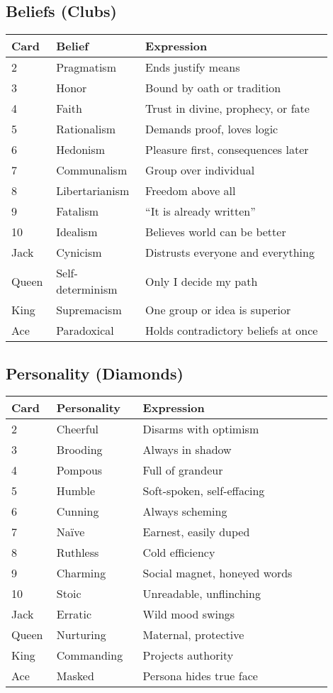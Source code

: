 \documentclass[12pt]{article}
\begin{document}
\subsection*{Beliefs (Clubs)}
\begin{longtable}{|p{0.1\linewidth}|p{0.25\linewidth}|p{0.55\linewidth}|}
\hline
\textbf{Card} & \textbf{Belief} & \textbf{Expression} \\
\hline
2 & Pragmatism & Ends justify means \\
3 & Honor & Bound by oath or tradition \\
4 & Faith & Trust in divine, prophecy, or fate \\
5 & Rationalism & Demands proof, loves logic \\
6 & Hedonism & Pleasure first, consequences later \\
7 & Communalism & Group over individual \\
8 & Libertarianism & Freedom above all \\
9 & Fatalism & ``It is already written'' \\
10 & Idealism & Believes world can be better \\
Jack & Cynicism & Distrusts everyone and everything \\
Queen & Self-determinism & Only I decide my path \\
King & Supremacism & One group or idea is superior \\
Ace & Paradoxical & Holds contradictory beliefs at once \\
\hline
\end{longtable}

\subsection*{Personality (Diamonds)}
\begin{longtable}{|p{0.1\linewidth}|p{0.25\linewidth}|p{0.55\linewidth}|}
\hline
\textbf{Card} & \textbf{Personality} & \textbf{Expression} \\
\hline
2 & Cheerful & Disarms with optimism \\
3 & Brooding & Always in shadow \\
4 & Pompous & Full of grandeur \\
5 & Humble & Soft-spoken, self-effacing \\
6 & Cunning & Always scheming \\
7 & Naïve & Earnest, easily duped \\
8 & Ruthless & Cold efficiency \\
9 & Charming & Social magnet, honeyed words \\
10 & Stoic & Unreadable, unflinching \\
Jack & Erratic & Wild mood swings \\
Queen & Nurturing & Maternal, protective \\
King & Commanding & Projects authority \\
Ace & Masked & Persona hides true face \\
\hline
\end{longtable}
\end{document}
